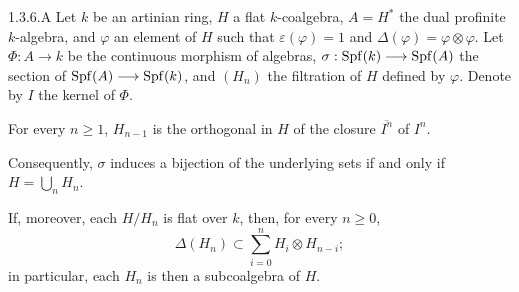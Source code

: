 \begin{lemma}{1.3.6.A}\label{VIIB.1.3.6.A}
Let $k$ be an artinian ring, $H$ a flat $k$-coalgebra, $A=H^*$ the dual profinite $k$-algebra, and $\varphi$ an element of $H$ such that $\varepsilon(\varphi)=1$ and $\Delta(\varphi)=\varphi\otimes\varphi$. Let $\Phi:A\to k$ be the continuous morphism of algebras, $\sigma:\operatorname{Spf}(k)\longrightarrow\operatorname{Spf}(A)$ the section of $\operatorname{Spf}(A)\longrightarrow\operatorname{Spf}(k)$, and $(H_n)$ the filtration of $H$ defined by $\varphi$. Denote by $I$ the kernel of $\Phi$.
\begin{enumeratei}
\item For every $n\geq1$, $H_{n-1}$ is the orthogonal in $H$ of the closure $\overline{I^n}$ of $I^n$.
\item Consequently, $\sigma$ induces a bijection of the underlying sets if and only if $H=\bigcup_n H_n$.
\item If, moreover, each $H/H_n$ is flat over $k$, then, for every $n\geq0$,
\begin{equation}\tag{*}
\Delta(H_n)\subset\sum_{i=0}^n H_i\otimes H_{n-i};
\end{equation}
in particular, each $H_n$ is then a subcoalgebra of $H$.
\end{enumeratei}
\end{lemma}
